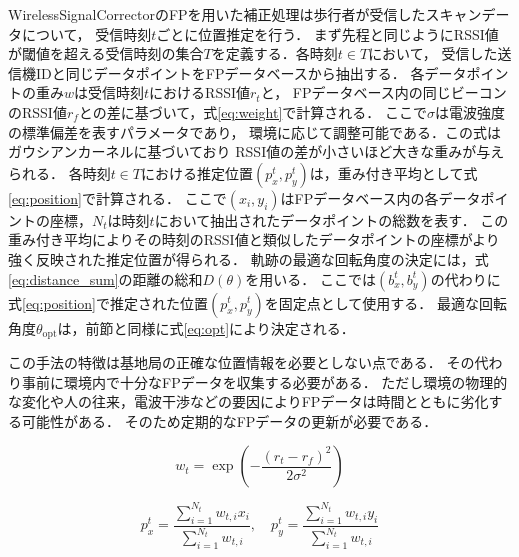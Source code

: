 WirelessSignalCorrectorのFPを用いた補正処理は歩行者が受信したスキャンデータについて，
受信時刻$t$ごとに位置推定を行う．
まず先程と同じようにRSSI値が閾値を超える受信時刻の集合$T$を定義する．各時刻$t \in T$において，
受信した送信機IDと同じデータポイントをFPデータベースから抽出する．
各データポイントの重み$w$は受信時刻$t$におけるRSSI値$r_t$と，
FPデータベース内の同じビーコンのRSSI値$r_f$との差に基づいて，式\eqref{eq:weight}で計算される．
ここで$\sigma$は電波強度の標準偏差を表すパラメータであり，
環境に応じて調整可能である．この式はガウシアンカーネルに基づいており
RSSI値の差が小さいほど大きな重みが与えられる．
各時刻$t \in T$における推定位置$(p_x^t, p_y^t)$は，重み付き平均として式\eqref{eq:position}で計算される．
ここで$(x_i, y_i)$はFPデータベース内の各データポイントの座標，$N_t$は時刻$t$において抽出されたデータポイントの総数を表す．
この重み付き平均によりその時刻のRSSI値と類似したデータポイントの座標がより強く反映された推定位置が得られる．
軌跡の最適な回転角度の決定には，式\eqref{eq:distance_sum}の距離の総和$D(\theta)$を用いる．
ここでは$(b_x^t, b_y^t)$の代わりに式\eqref{eq:position}で推定された位置$(p_x^t, p_y^t)$を固定点として使用する．
最適な回転角度$\theta_{\mathrm{opt}}$は，前節と同様に式\eqref{eq:opt}により決定される．

この手法の特徴は基地局の正確な位置情報を必要としない点である．
その代わり事前に環境内で十分なFPデータを収集する必要がある．
ただし環境の物理的な変化や人の往来，電波干渉などの要因によりFPデータは時間とともに劣化する可能性がある．
そのため定期的なFPデータの更新が必要である．

\begin{equation}
\label{eq:weight}
w_t = \exp\left(-\frac{(r_t - r_f)^2}{2\sigma^2}\right)
\end{equation}

\begin{equation}
\label{eq:position}
p_x^t = \frac{\sum_{i=1}^{N_t} w_{t,i} x_i}{\sum_{i=1}^{N_t} w_{t,i}}, \quad
p_y^t = \frac{\sum_{i=1}^{N_t} w_{t,i} y_i}{\sum_{i=1}^{N_t} w_{t,i}}
\end{equation}


